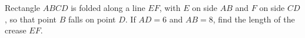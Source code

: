 Rectangle $ABCD$ is folded along a line $EF$, with $E$ on side $AB$ and $F$ on side $CD$, so that point $B$ falls on point $D$. If $AD=6$ and $AB=8$, find the length of the crease $EF$.
